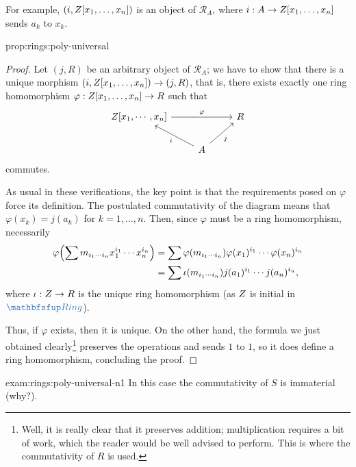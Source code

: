 For example, $(i, Z[x_1, \ldots, x_n])$ is an object of
$\mathscr{R}_A$, where $i : A \to Z[x_1, \ldots, x_n]$ sends $a_k$ to
$x_k$.
\begin{prop}{}{prop:rings:poly-universal}
\end{prop}
\begin{proof}
  Let $(j, R)$ be an arbitrary object of $\mathscr{R}_A$; we have to
  show that there is a unique morphism
  $(i, Z[x_1, \ldots, x_n]) \to (j, R)$, that is, there exists
  exactly one ring homomorphism $\varphi : Z[x_1, \ldots, x_n] \to R$
  such that
  \[
    \begin{tikzcd}
      \Z[x_1, \cdots, x_n] \arrow[rr, "\varphi"] & & R \\
      & A \arrow[ul, "i"] \arrow[ur, "j"']
    \end{tikzcd}
  \]
  commutes.

  As usual in these verifications, the key point is that the
  requirements posed on $\varphi$ force its definition. The postulated
  commutativity of the diagram means that $\varphi(x_k) = j(a_k)$ for
  $k = 1, \ldots, n$. Then, since $\varphi$ must be a ring
  homomorphism, necessarily
  \begin{align*}
    \varphi\Bigl(\sum m_{i_1 \cdots i_n} x_1^{i_1} \cdots x_n^{i_n}\Bigr) &= \sum \varphi(m_{i_1 \cdots i_n}) \varphi(x_1)^{i_1} \cdots \varphi(x_n)^{i_n} \\
                                                                          &= \sum \iota(m_{i_1 \cdots i_n}) j(a_1)^{i_1} \cdots j(a_n)^{i_n},
  \end{align*}
  where $\iota : Z \to R$ is the unique ring homomorphism (as $Z$ is
  initial in $\categ{Ring}$).

  Thus, if $\varphi$ exists, then it is unique. On the other hand, the
  formula we just obtained clearly\footnote{Well, it is really clear
    that it preserves addition; multiplication requires a bit of work,
    which the reader would be well advised to perform. This is where
    the commutativity of $R$ is used.} preserves the operations and
  sends $1$ to $1$, so it does define a ring homomorphism, concluding
  the proof.
\end{proof}
\begin{exam}{}{exam:rings:poly-universal-n1}
   In this case the commutativity of
  $S$ is immaterial (why?).
\end{exam}
